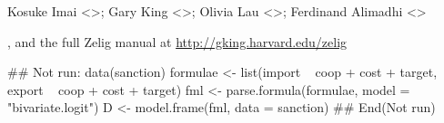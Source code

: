 \begin{Author}\relax
Kosuke Imai <>; Gary King
<>; Olivia Lau <>; Ferdinand Alimadhi
<>
\end{Author}
\begin{SeeAlso}\relax
{},  and the full Zelig manual at
\url{http://gking.harvard.edu/zelig}
\end{SeeAlso}
\begin{Examples}
\begin{ExampleCode}
## Not run: 
data(sanction)
formulae <- list(import ~ coop + cost + target,
                 export ~ coop + cost + target)
fml <- parse.formula(formulae, model = "bivariate.logit")
D <- model.frame(fml, data = sanction)
## End(Not run)\end{ExampleCode}
\end{Examples}


